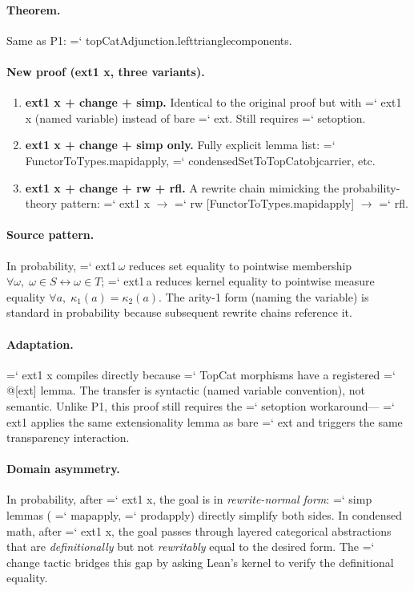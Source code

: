 \documentclass[11pt]{article}
\renewcommand{\texttt}[1]{%
  \begingroup\ttfamily\hyphenchar\font=`\-\relax
  \def\_{\textunderscore\discretionary{}{}{}}%
  #1\endgroup}
\theoremstyle{definition}
\theoremstyle{remark}
\begin{document}
\paragraph{Theorem.}
Same as P1: \texttt{topCatAdjunction.left\_triangle\_components}.

\paragraph{New proof (ext1 x, three variants).}
\begin{enumerate}
\item \textbf{ext1 x + change + simp.}  Identical to the original
  proof but with \texttt{ext1 x} (named variable) instead of bare
  \texttt{ext}.  Still requires \texttt{set\_option}.
\item \textbf{ext1 x + change + simp only.}  Fully explicit lemma
  list: \texttt{FunctorToTypes.map\_id\_apply},
  \texttt{condensedSetToTopCat\_obj\_carrier}, etc.
\item \textbf{ext1 x + change + rw + rfl.}  A rewrite chain
  mimicking the probability-theory pattern: \texttt{ext1 x} $\to$
  \texttt{rw [FunctorToTypes.map\_id\_apply]} $\to$ \texttt{rfl}.
\end{enumerate}

\paragraph{Source pattern.}  In probability, \texttt{ext1\,$\omega$}
reduces set equality to pointwise membership
$\forall \omega,\; \omega \in S \leftrightarrow \omega \in T$;
\texttt{ext1\,a} reduces kernel equality to pointwise measure
equality $\forall a,\; \kappa_1(a) = \kappa_2(a)$.  The
arity-1 form (naming the variable) is standard in probability
because subsequent rewrite chains reference it.

\paragraph{Adaptation.}  \texttt{ext1 x} compiles directly because
\texttt{TopCat} morphisms have a registered \texttt{@[ext]} lemma.
The transfer is syntactic (named variable convention), not semantic.
Unlike P1, this proof still requires the \texttt{set\_option}
workaround---\texttt{ext1} applies the same extensionality lemma
as bare \texttt{ext} and triggers the same transparency interaction.

\paragraph{Domain asymmetry.}  In probability, after \texttt{ext1 x},
the goal is in \emph{rewrite-normal form}: \texttt{simp} lemmas
(\texttt{map\_apply}, \texttt{prod\_apply}) directly simplify both
sides.  In condensed math, after \texttt{ext1 x}, the goal passes
through layered categorical abstractions that are
\emph{definitionally} but not \emph{rewritably} equal to the
desired form.  The \texttt{change} tactic bridges this gap by
asking Lean's kernel to verify the definitional equality.
\end{document}
